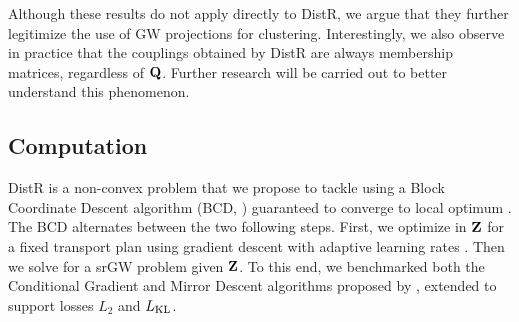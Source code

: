 Although these results do not apply directly to DistR, we argue that they further legitimize the use of GW projections for clustering. Interestingly, we also observe in practice that the couplings obtained by DistR are always membership matrices, regardless of ${\mathbf{Q}}$. Further research will be carried out to better understand this phenomenon. 


\subsection{Computation}\label{sec:computation_GW}

DistR is a non-convex problem that we propose to tackle using a Block Coordinate Descent algorithm (BCD, \citealt{tseng2001convergence}) guaranteed to converge to local optimum \citep{grippo2000convergence, Lyu2023bmm}. The BCD alternates between the two following steps. First, we optimize in ${\mathbf{Z}}$ for a fixed transport plan using gradient descent with adaptive learning rates \citep{kingma2014adam}. Then we solve for a srGW problem given ${\mathbf{Z}}$. To this end, we benchmarked both the Conditional Gradient and Mirror Descent algorithms proposed by \citep{vincent2021semi}, extended to support losses $L_2$ and $L_{\operatorname{KL}}$.

